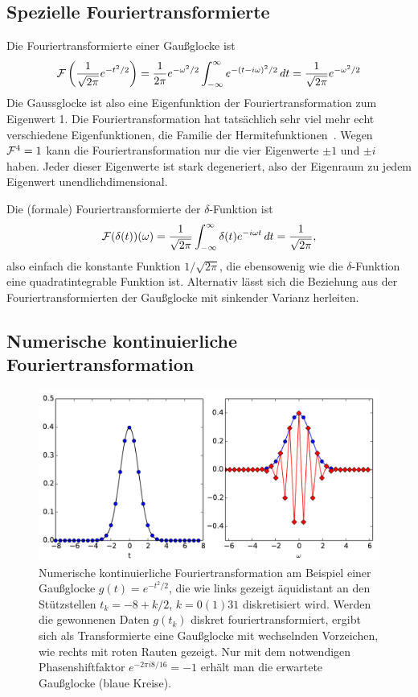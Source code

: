 \subsection{Spezielle Fouriertransformierte}

Die Fouriertransformierte einer Gaußglocke ist
\begin{equation}
  \mathcal F\left(\frac{1}{\sqrt{2\pi}}e^{-t^2/2}\right)
  =
  \frac{1}{2\pi}e^{-\omega^2/2}\int_{-\infty}^{\infty} e^{-(t-i\omega)^2/2}\, dt
  =
  \frac{1}{\sqrt{2\pi}}e^{-\omega^2/2}
\end{equation}
Die Gaussglocke ist also eine Eigenfunktion der Fouriertransformation
zum Eigenwert 1. Die Fouriertransformation hat tatsächlich sehr viel
mehr echt verschiedene Eigenfunktionen, die Familie der
Hermitefunktionen~\cite{pinsky02a}. Wegen $\mathcal F^4=1$ kann die
Fouriertransformation nur die vier Eigenwerte $\pm 1$ und $\pm i$
haben. Jeder dieser Eigenwerte ist stark degeneriert, also der
Eigenraum zu jedem Eigenwert unendlichdimensional.

Die (formale) Fouriertransformierte der $\delta$-Funktion ist
\begin{equation}
  \label{eq:fourierdelta}
  \mathcal F(\delta(t))(\omega)
  =
  \frac{1}{\sqrt{2\pi}}\int_{-\infty}^{\infty}
  \delta(t)e^{-i \omega t}\, dt = \frac{1}{\sqrt{2\pi}},
\end{equation}
also einfach die konstante Funktion $1/\sqrt{2\pi}$, die ebensowenig
wie die $\delta$-Funktion eine quadratintegrable Funktion
ist. Alternativ lässt sich die Beziehung aus der
Fouriertransformierten der Gaußglocke mit sinkender Varianz herleiten.

\subsection{Numerische kontinuierliche Fouriertransformation}
\label{sec:contdft}

\begin{figure}
  \centering
  \includegraphics[width=\textwidth]{plots/dft}
  \caption{Numerische kontinuierliche Fouriertransformation am Beispiel einer
  Gaußglocke $g(t) = e^{-t^2/2}$, die wie links gezeigt äquidistant
  an den Stützstellen $t_k=-8 + k/2$, $k=0(1)31$ diskretisiert wird.
  Werden die gewonnenen Daten $g(t_k)$ diskret fouriertransformiert,
  ergibt sich als Transformierte eine Gaußglocke mit wechselnden
  Vorzeichen, wie rechts mit roten Rauten gezeigt. Nur mit dem
  notwendigen Phasenshiftfaktor $e^{-2\pi i 8/16}=-1$ erhält man die
  erwartete Gaußglocke (blaue Kreise).}
  \label{fig:contdft}
\end{figure}

